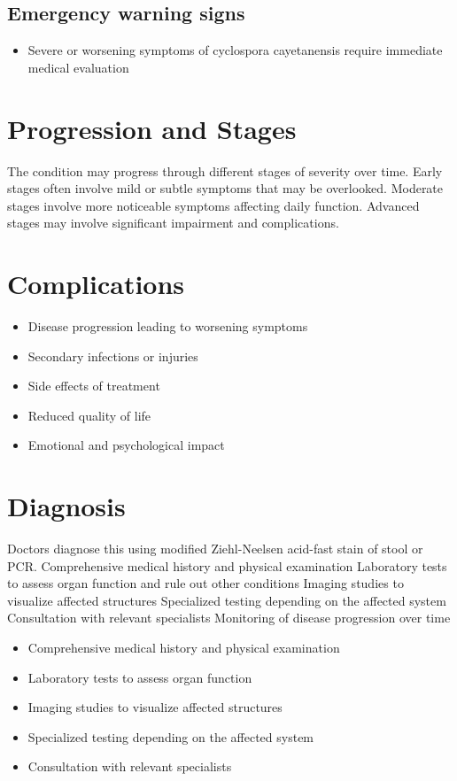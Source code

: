 \subsection{Emergency warning signs}
\begin{itemize}[noitemsep]
  \item Severe or worsening symptoms of cyclospora cayetanensis require immediate medical evaluation
\end{itemize}
\section{Progression and Stages}
The condition may progress through different stages of severity over time. Early stages often involve mild or subtle symptoms that may be overlooked. Moderate stages involve more noticeable symptoms affecting daily function. Advanced stages may involve significant impairment and complications.
\section{Complications}
\begin{itemize}[noitemsep]
  \item Disease progression leading to worsening symptoms
  \item Secondary infections or injuries
  \item Side effects of treatment
  \item Reduced quality of life
  \item Emotional and psychological impact
\end{itemize}
\section{Diagnosis}
Doctors diagnose this using modified Ziehl-Neelsen acid-fast stain of stool or PCR. Comprehensive medical history and physical examination Laboratory tests to assess organ function and rule out other conditions Imaging studies to visualize affected structures Specialized testing depending on the affected system Consultation with relevant specialists Monitoring of disease progression over time

\begin{itemize}[noitemsep]
  \item Comprehensive medical history and physical examination
  \item Laboratory tests to assess organ function
  \item Imaging studies to visualize affected structures
  \item Specialized testing depending on the affected system
  \item Consultation with relevant specialists
\end{itemize}
